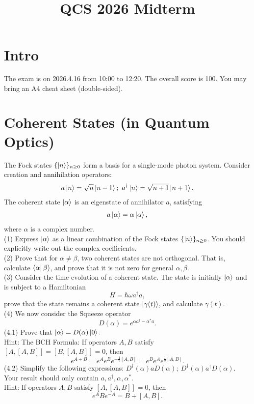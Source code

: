\documentclass[12pt]{article}
\title{\textbf{QCS 2026 Midterm}}
\author{}
\date{}
\begin{document}
\maketitle

\section*{Intro}
The exam is on 2026.4.16 from 10:00 to 12:20. The overall score is 100. You may bring an A4 cheat sheet (double-sided).

\section{Coherent States (in Quantum Optics)}
The Fock states $\{\ket n\}_{n\geq 0}$ form a basis for a single-mode photon system. Consider creation and annihilation operators:
\[a\ket n=\sqrt{n}\ket{n-1};\ a^\dagger\ket n=\sqrt{n+1}\ket{n+1}.\]
The coherent state $\ket\alpha$ is an eigenstate of annihilator $a$, satisfying
\[a\ket\alpha=\alpha\ket{\alpha},\]
where $\alpha$ is a complex number.\\
(1) Express $\ket\alpha$ as a linear combination of the Fock states $\{\ket n\}_{n\geq 0}$. You should explicitly write out the complex coefficients. \\
(2) Prove that for $\alpha\neq \beta$, two coherent states are not orthogonal. That is, calculate $\bra\alpha\beta\rangle$, and prove that it is not zero for general $\alpha,\beta$. \\
(3) Consider the time evolution of a coherent state. The state is initially $\ket\alpha$ and is subject to a Hamiltonian
\[H=\hbar\omega a^\dagger a, \]
prove that the state remains a coherent state $\ket{\gamma(t)}$, and calculate $\gamma(t)$. \\
(4) We now consider the Squeeze operator
\[D(\alpha)=e^{\alpha a^\dagger-\alpha^*a}.\]
(4.1) Prove that $\ket\alpha=D(\alpha)\ket 0.$\\
Hint: The BCH Formula: If operators $A,B$ satisfy $[A,[A,B]]=[B,[A,B]]=0$, then
\[e^{A+B}=e^Ae^Be^{-\frac{1}{2}[A,B]}=e^Be^Ae^{\frac{1}{2}[A,B]}.\]
(4.2) Simplify the following expressions: $D^\dagger(\alpha)aD(\alpha);\ D^\dagger(\alpha)a^\dagger D(\alpha).$ Your result should only contain $a,a^\dagger, \alpha,\alpha^*.$\\
Hint: If operators $A,B$ satisfy $[A,[A,B]]=0$, then
\[e^ABe^{-A}=B+[A,B].\]
\end{document}
